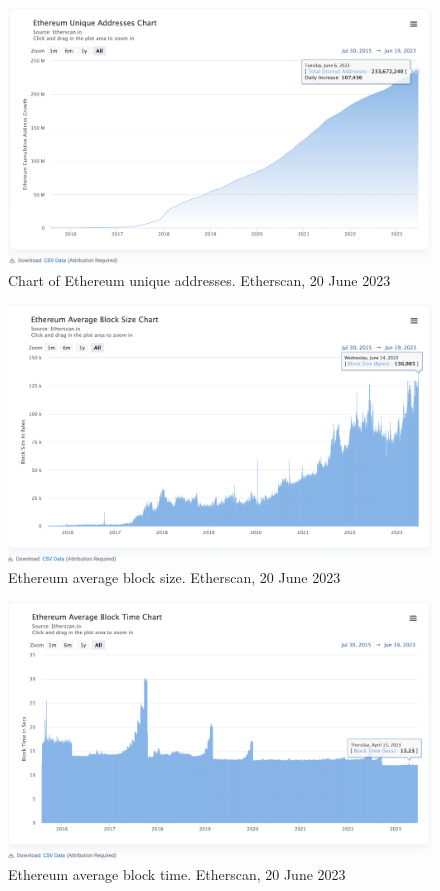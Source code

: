 \documentclass[UTF8]{article}
\begin{document}
{\begin{figure}[htbp]
\begin{center}
\includegraphics[width=0.9\linewidth]{images/ethuniqueaddr}
\caption{Chart of Ethereum unique addresses. Etherscan, 20 June 2023}
\label{fig:ethuniqueaddr}
\end{center}
\end{figure}

\begin{figure}[htbp]
\begin{center}
\includegraphics[width=0.9\linewidth]{images/ethavgblk}
\caption{Ethereum average block size. Etherscan, 20 June 2023}
\label{fig:ethavgblk}
\end{center}
\end{figure}

\begin{figure}[htbp]
\begin{center}
\includegraphics[width=0.9\linewidth]{images/ethavgtime}
\caption{Ethereum average block time. Etherscan, 20 June 2023}
\label{fig:ethavgtime}
\end{center}
\end{figure}

}
\end{document}

